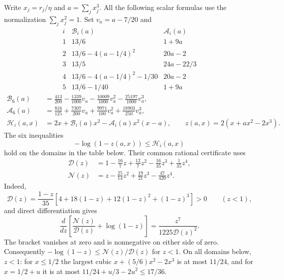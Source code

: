 \documentclass[11pt,a4paper]{article}
\numberwithin{equation}{section}
\begin{document}
Write $x_j=r_j/\eta$ and $a=\sum_jx_j^3$.
All the following scalar formulas use the normalization $\sum_jx_j^2=1$.
Set $v_a=a-7/20$ and
\[
\begin{array}{c|c|c}
 i&\mathcal B_i(a)&\mathcal A_i(a)\\\hline
 1&13/6&1+9a\\
 2&13/6-4(a-1/4)^2&20a-2\\
 3&13/5&24a-22/3\\
 4&13/6-4(a-1/4)^2-1/30&20a-2\\
 5&13/6-1/40&1+9a
\end{array}
\]
\[
\begin{aligned}
 \mathcal B_6(a)&=\frac{413}{200}-\frac{1339}{1000}v_a
               -\frac{10009}{1000}v_a^2-\frac{25197}{1000}v_a^3,\\
 \mathcal A_6(a)&=\frac{816}{125}+\frac{7307}{200}v_a
                +\frac{9971}{100}v_a^2+\frac{18903}{250}v_a^3,\\
 \mathcal H_i(a,x)&=2x+\mathcal B_i(a)x^2-\mathcal A_i(a)x^2(x-a),\qquad
 z(a,x)=2(x+ax^2-2x^3).
\end{aligned}
\]
The six inequalities
\begin{equation}\label{eq:app-up-scalar-logdet}
 -\log(1-z(a,x))\le\mathcal H_i(a,x)
\end{equation}
hold on the domains in the table below. Their common rational certificate
uses
\[
\begin{aligned}
 \mathcal D(z)&=1-\frac{16}{7}z+\frac{12}{7}z^2
                    -\frac{16}{35}z^3+\frac1{35}z^4,\\
 \mathcal N(z)&=z-\frac{25}{14}z^2+\frac{19}{21}z^3
                    -\frac{47}{420}z^4.
\end{aligned}
\]
Indeed,
\[
 \mathcal D(z)=\frac{1-z}{35}
 [4+18(1-z)+12(1-z)^2+(1-z)^3]>0\qquad(z<1),
\]
and direct differentiation gives
\[
 \frac{d}{dz}\left[\frac{\mathcal N(z)}{\mathcal D(z)}+\log(1-z)\right]
 =\frac{z^7}{1225\mathcal D(z)^2}.
\]
The bracket vanishes at zero and is nonnegative on either side of zero.
Consequently $-\log(1-z)\le\mathcal N(z)/\mathcal D(z)$ for $z<1$.
On all domains below, $z<1$: for $x\le1/2$ the largest cubic
$x+(5/6)x^2-2x^3$ is at most $11/24$, and for $x=1/2+u$ it is at most
$11/24+u/3-2u^2\le17/36$.
\end{document}
